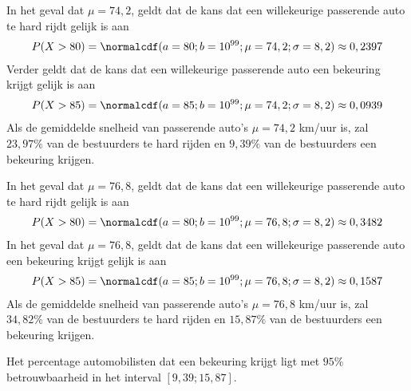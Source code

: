 \begin{enumerate}[label=(\alph*)]
{        In het geval dat $\mu = 74,2$, geldt dat de kans dat een willekeurige passerende auto te hard rijdt gelijk is aan 
        \begin{align*}
            P(X > 80) = \normalcdf(a=80; b=10^{99}; \mu=74,2; \sigma=8,2) \approx 0,2397
        \end{align*}
        Verder geldt dat de kans dat een willekeurige passerende auto een bekeuring krijgt gelijk is aan 
        \begin{align*}
            P(X > 85) = \normalcdf(a=85; b=10^{99}; \mu=74,2; \sigma=8,2) \approx 0,0939
        \end{align*}
        Als de gemiddelde snelheid van passerende auto's $\mu=74,2$ km/uur is, zal $23,97\%$ van de bestuurders te hard rijden en $9,39\%$ van de bestuurders een bekeuring krijgen.

        In het geval dat $\mu = 76,8$, geldt dat de kans dat een willekeurige passerende auto te hard rijdt gelijk is aan 
        \begin{align*}
            P(X > 80) = \normalcdf(a=80; b=10^{99}; \mu=76,8; \sigma=8,2) \approx 0,3482
        \end{align*}
        In het geval dat $\mu = 76,8$, geldt dat de kans dat een willekeurige passerende auto een bekeuring krijgt gelijk is aan 
        \begin{align*}
            P(X > 85) = \normalcdf(a=85; b=10^{99}; \mu=76,8; \sigma=8,2) \approx 0,1587
        \end{align*}
        Als de gemiddelde snelheid van passerende auto's $\mu=76,8$ km/uur is, zal $34,82\%$ van de bestuurders te hard rijden en $15,87\%$ van de bestuurders een bekeuring krijgen.

        Het percentage automobilisten dat een bekeuring krijgt ligt met $95\%$ betrouwbaarheid in het interval $[9,39; 15,87]$.
    }
\end{enumerate}
